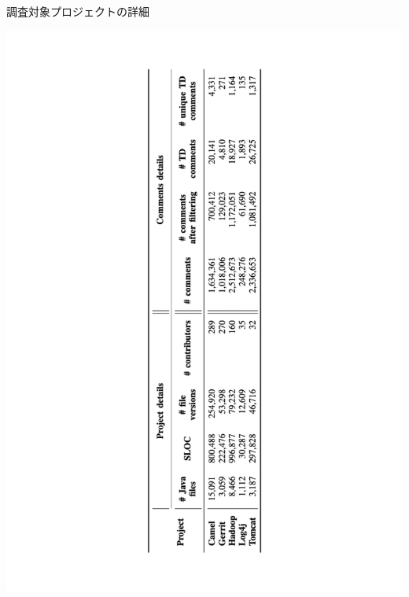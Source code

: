 \begin{table}[t]
    \centering
    \caption{調査対象プロジェクトの詳細}
    \includegraphics[height=0.9\linewidth, angle=270]{./thesis1/data-table1.pdf}
    \label{fig:1_data-table}
\end{table}








